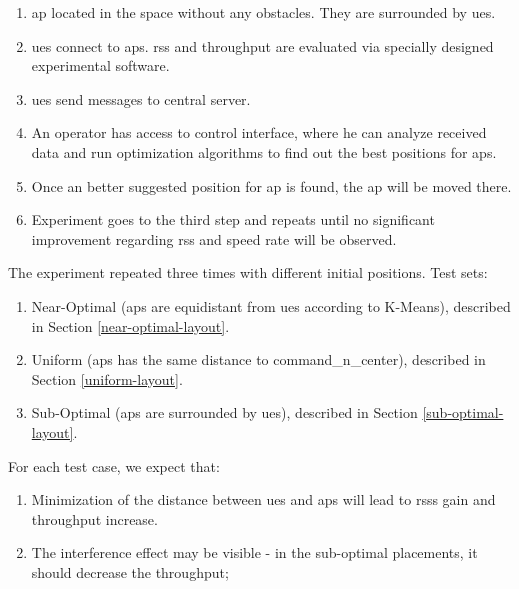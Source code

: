 \begin{enumerate}
\def\labelenumi{\arabic{enumi}.}
\tightlist
\item
  \gls{ap} located in the space without any obstacles. They are surrounded by
  \glspl{ue}.
\item
  \glspl{ue} connect to \glspl{ap}. \Gls{rss} and throughput are evaluated via specially designed experimental software.
\item
  \Glspl{ue} send messages to central server.
\item
  An operator has access to control interface, where he can analyze received data and run optimization algorithms to find out the best positions for \glspl{ap}.
\item
  Once an better suggested position for \gls{ap} is found, the \gls{ap} will be moved there.
\item
  Experiment goes to the third step and repeats until no significant improvement regarding \gls{rss} and speed rate will be observed.
\end{enumerate}

The experiment repeated three times with different initial positions. Test sets:

\begin{enumerate}
\def\labelenumi{\arabic{enumi}.}
\tightlist
\item
Near-Optimal (\glspl{ap} are equidistant from \glspl{ue}  according to K-Means), described in Section \ref{near-optimal-layout}.
\item
Uniform (\glspl{ap} has the same distance to \gls{command_n_center}), described in Section \ref{uniform-layout}.  
\item
Sub-Optimal (\glspl{ap} are surrounded by \glspl{ue}), described in Section \ref{sub-optimal-layout}.


\end{enumerate}

For each test case, we expect that:

\begin{enumerate}
\def\labelenumi{\arabic{enumi}.}
\tightlist
\item
  Minimization of the distance between \glspl{ue} and \glspl{ap} will lead to \glspl{rss} gain and throughput increase.
\item
  The interference effect may be visible - in the sub-optimal
  placements, it should decrease the throughput;
\end{enumerate}